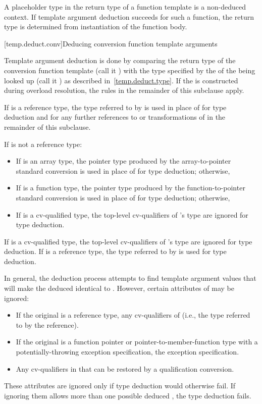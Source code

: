 \pnum
A placeholder type in the return type of a
function template is a non-deduced context. If template argument
deduction succeeds for such a function, the return type is determined
from instantiation of the function body.

[temp.deduct.conv]{Deducing conversion function template arguments}

\pnum
Template argument deduction is done by comparing the return type of
the
conversion function template
(call it
)
with the type specified by the  of the
 being looked up
(call it ) as described in~\ref{temp.deduct.type}.
If the  is constructed during
overload resolution,
the rules in the remainder of this subclause apply.

\pnum
If  is a reference type, the type referred to by  is used in place
of  for type deduction and for any further references to or transformations of
 in the remainder of this subclause.

\pnum
If
is not a reference type:

\begin{itemize}
\item
If
is an array type, the pointer type produced by the
array-to-pointer standard conversion is used in place of
for type
deduction; otherwise,
\item
If
is a function type, the pointer type produced by the
function-to-pointer standard conversion is used in place of
for
type deduction; otherwise,
\item
If
is a cv-qualified type, the top-level cv-qualifiers of
's
type are ignored for type deduction.
\end{itemize}

\pnum
If
is a cv-qualified type, the top-level cv-qualifiers of
's
type are ignored for type deduction.
If
is a
reference type, the type referred to by
is used for type deduction.

\pnum
In general, the deduction process attempts to find template argument
values that will make the deduced
identical to
.
However, certain attributes of  may be ignored:

\begin{itemize}
\item
If the original  is a reference type,
any cv-qualifiers of 
(i.e., the type referred to by the reference).
\item
If the original  is
a function pointer or pointer-to-member-function type
with a potentially-throwing exception specification,
the exception specification.
\item
Any cv-qualifiers in 
that can be restored by a qualification conversion.
\end{itemize}
These attributes are ignored only if type deduction would
otherwise fail.
If ignoring them allows more than one possible deduced
,
the type deduction fails.

